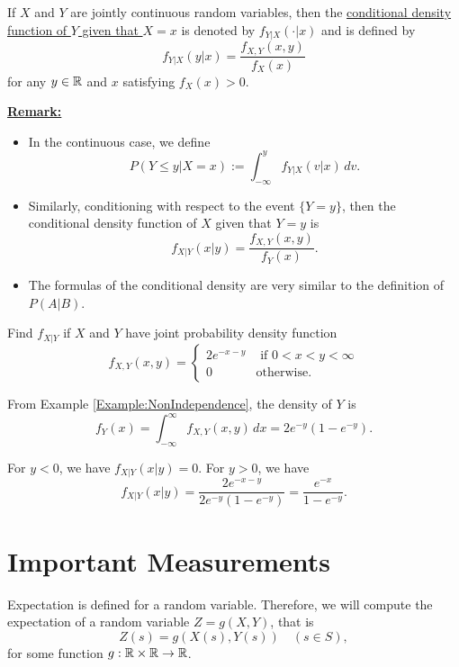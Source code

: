 \begin{definition}
If $X$ and $Y$ are jointly continuous random variables, then the \ul{conditional density function of $Y$ given that $X = x$} is denoted by $f_{Y|X} (\cdot | x)$ and is defined by
    \[
        f_{Y|X} (y|x) = \frac{f_{X, Y} (x, y)}{f_X (x)}
    \]
for any $y \in \mathbb{R}$ and $x$ satisfying $f_X (x) > 0$. 
\end{definition}

\underline{\textbf{Remark:}} 
\begin{itemize}
    \item In the continuous case, we define
        \[
            P (Y \leq y | X = x) := \int_{-\infty}^y f_{Y|X} (v|x) \, dv .
        \]
    \item Similarly, conditioning with respect to the event $\{ Y = y \}$, then the conditional density function of $X$ given that $Y = y$ is
        \[
            f_{X|Y} (x|y) = \frac{f_{X, Y} (x, y)}{f_Y (x)} .
        \]
    \item The formulas of the conditional density are very similar to the definition of $P (A|B)$.
\end{itemize}

\begin{example}
Find $f_{X|Y}$ if $X$ and $Y$ have joint probability density function 
    \[
        f_{X, Y} (x ,y) = \left\lbrace \begin{matrix} 2 e^{-x - y} & \text{ if } 0 < x < y < \infty \\
        0 & \text{otherwise.} \end{matrix} \right.
    \]
\end{example}
\begin{sol*}
From Example \ref{Example:NonIndependence}, the density of $Y$ is
    \[
        f_Y (x) = \int_{-\infty}^\infty f_{X, Y} (x, y) \, dx = 2e^{-y} (1 - e^{-y}) .
    \]

For $y < 0$, we have $f_{X|Y} (x|y) = 0$. For $y > 0$, we have
    \[
        f_{X|Y} (x|y) = \frac{2e^{-x-y}}{2e^{-y} (1 - e^{-y})} = \frac{e^{-x}}{1 - e^{-y}} . \tag*{$\triangle$}
    \]
\end{sol*}

\section{Important Measurements}

Expectation is defined for a random variable. Therefore, we will compute the expectation of a random variable $Z = g (X, Y)$, that is
    \[
        Z (s) = g (X (s), Y (s)) \quad (s \in S ),
    \]
for some function $g : \mathbb{R} \times \mathbb{R} \rightarrow \mathbb{R}$.

